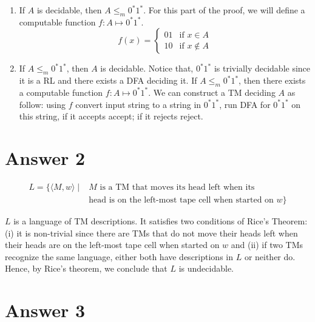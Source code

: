 \documentclass[12pt]{article}
\begin{document}
\begin{enumerate}
	\item If $A$ is decidable, then $A \leq_m 0^*1^*$. For this part of the proof, we will define a computable function $f: A \mapsto 0^*1^*$.
	\[
 	f(x) = \begin{cases} 
  	 01 & \text{if } x \in A \\
  	 10       & \text{if } x \not \in A
  	\end{cases}
	\]
	
	\item If $A \leq_m 0^*1^*$, then $A$ is decidable. Notice that, $0^*1^*$ is trivially decidable since it is a RL and there exists a DFA deciding it. If $A \leq_m 0^*1^*$, then there exists a computable function $f: A \mapsto 0^*1^*$. We can construct a TM deciding $A$ as follow: using $f$ convert input string to a string in $0^*1^*$, run DFA for $0^*1^*$ on this string, if it accepts accept; if it rejects reject.

\end{enumerate}

\section*{Answer 2}

\begin{equation*}
\begin{split}
L = \{\langle M, w \rangle \mid & M \text{ is a TM that moves its head left when its}\\
	& \text{head is on the left-most tape cell when started on } w\}
\end{split}
\end{equation*}

$L$ is a language of TM descriptions. It satisfies two conditions of Rice’s Theorem: (i) it is non-trivial since there are TMs that do not move their heads left when their heads are on the left-most tape cell when started on $w$ and (ii) if two TMs recognize the same language, either both have descriptions in $L$ or neither do. Hence, by Rice’s theorem, we conclude that $L$ is undecidable.



\section*{Answer 3}
\end{document}
